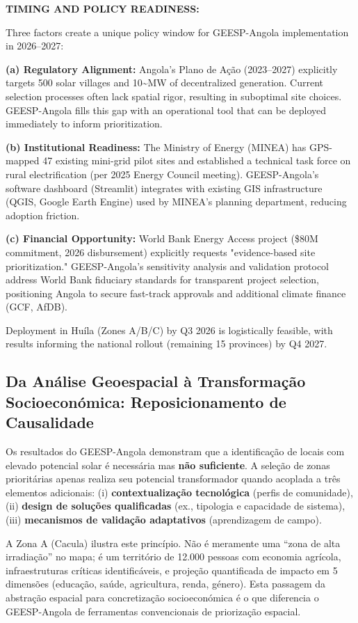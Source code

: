 \documentclass[12pt, a4paper]{article}
\begin{document}
\noindent\textbf{TIMING AND POLICY READINESS:}

Three factors create a unique policy window for GEESP-Angola implementation in 2026--2027:

\textbf{(a) Regulatory Alignment:} Angola's Plano de Ação (2023--2027) explicitly targets 500 solar villages and 10\textasciitilde{}MW of decentralized generation. Current selection processes often lack spatial rigor, resulting in suboptimal site choices. GEESP-Angola fills this gap with an operational tool that can be deployed immediately to inform prioritization.

\textbf{(b) Institutional Readiness:} The Ministry of Energy (MINEA) has GPS-mapped 47 existing mini-grid pilot sites and established a technical task force on rural electrification (per 2025 Energy Council meeting). GEESP-Angola's software dashboard (Streamlit) integrates with existing GIS infrastructure (QGIS, Google Earth Engine) used by MINEA's planning department, reducing adoption friction.

\textbf{(c) Financial Opportunity:} World Bank Energy Access project (\$80M commitment, 2026 disbursement) explicitly requests "evidence-based site prioritization." GEESP-Angola's sensitivity analysis and validation protocol address World Bank fiduciary standards for transparent project selection, positioning Angola to secure fast-track approvals and additional climate finance (GCF, AfDB).

Deployment in Huíla (Zones A/B/C) by Q3 2026 is logistically feasible, with results informing the national rollout (remaining 15 provinces) by Q4 2027.

\subsection{Da Análise Geoespacial à Transformação Socioeconómica: Reposicionamento de Causalidade}

Os resultados do GEESP-Angola demonstram que a identificação de locais com elevado 
potencial solar é necessária mas \textbf{não suficiente}. A seleção de zonas prioritárias 
apenas realiza seu potencial transformador quando acoplada a três elementos adicionais: (i) \textbf{contextualização tecnológica} (perfis de comunidade), (ii) \textbf{design de soluções qualificadas} (ex., tipologia e capacidade de sistema), (iii) \textbf{mecanismos de validação adaptativos} (aprendizagem de campo).

A Zona A (Cacula) ilustra este princípio. Não é meramente uma ``zona de alta irradiação'' 
no mapa; é um território de 12.000 pessoas com economia agrícola, infraestruturas críticas 
identificáveis, e projeção quantificada de impacto em 5 dimensões (educação, saúde, 
agricultura, renda, género). Esta passagem da abstração espacial para concretização 
socioeconómica é o que diferencia o GEESP-Angola de ferramentas convencionais de 
priorização espacial.
\end{document}
